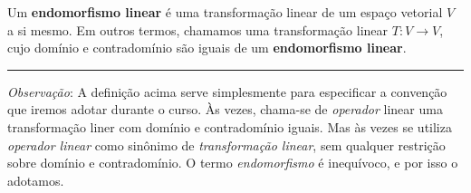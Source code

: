 \begin{definition}
	Um \textbf{endomorfismo linear} é uma transformação linear de um espaço vetorial $V$ a si mesmo. Em outros termos, chamamos uma transformação linear $T\colon V\to V$, cujo domínio e contradomínio são iguais de um \textbf{endomorfismo linear}.
\end{definition}

\hrule

\textit{Observação}: A definição acima serve simplesmente para especificar a convenção que iremos adotar durante o curso. Às vezes, chama-se de \textit{operador} linear uma transformação liner com domínio e contradomínio iguais. Mas às vezes se utiliza \textit{operador linear} como sinônimo de \textit{transformação linear}, sem qualquer restrição sobre domínio e contradomínio. O termo \textit{endomorfismo} é inequívoco, e por isso o adotamos.